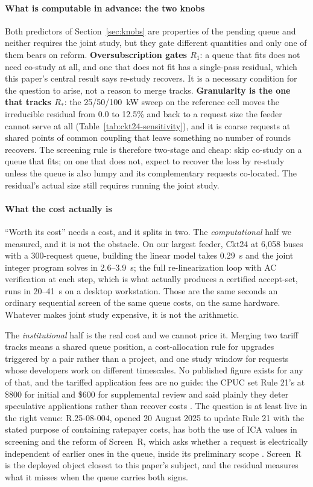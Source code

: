 \documentclass[review,authoryear,12pt]{elsarticle}
\begin{document}
\paragraph{What is computable in advance: the two knobs}
Both predictors of Section~\ref{sec:knobs} are properties of the pending queue
and neither requires the joint study, but they gate different quantities and
only one of them bears on reform. \textbf{Oversubscription gates $R_{1}$}: a
queue that fits does not need co-study at all, and one that does not fit has a
single-pass residual, which this paper's central result says re-study
recovers. It is a necessary condition for the question to arise, not a reason
to merge tracks. \textbf{Granularity is the one that tracks $R_{\ast}$}: the
25/50/100~kW sweep on the reference cell moves the irreducible residual from
0.0 to 12.5\% and back to a request size the feeder cannot serve at all
(Table~\ref{tab:ckt24-sensitivity}), and it is coarse requests at shared
points of common coupling that leave something no number of rounds recovers.
The screening rule is therefore two-stage and cheap: skip co-study on a queue
that fits; on one that does not, expect to recover the loss by re-study unless
the queue is also lumpy and its complementary requests co-located. The
residual's actual size still requires running the joint study.

\paragraph{What the cost actually is}
``Worth its cost'' needs a cost, and it splits in two. The
\emph{computational} half we measured, and it is not the obstacle. On our
largest feeder, Ckt24 at 6{,}058 buses with a 300-request queue, building the
linear model takes 0.29~s and the joint integer program solves in 2.6--3.9~s;
the full re-linearization loop with AC verification at each step, which is what
actually produces a certified accept-set, runs in 20--41~s on a desktop
workstation. Those are the same seconds an ordinary sequential screen of the
same queue costs, on the same hardware. Whatever makes joint study expensive,
it is not the arithmetic.

The \emph{institutional} half is the real cost and we cannot price it. Merging
two tariff tracks means a shared queue position, a cost-allocation rule for
upgrades triggered by a pair rather than a project, and one study window for
requests whose developers work on different timescales. No published figure
exists for any of that, and the tariffed application fees are no guide: the
CPUC set Rule 21's at \$800 for initial and \$600 for supplemental review and
said plainly they deter speculative applications rather than recover costs
\citep{cpuc_d0508013}. The question is at least live in the right venue:
R.25-08-004, opened 20 August 2025 to update Rule 21 with the stated purpose of
containing ratepayer costs, has both the use of ICA values in screening and the
reform of Screen~R, which asks whether a request is electrically independent
of earlier ones in the queue, inside its preliminary scope
\citep{cpuc_oir2025}. Screen~R is the deployed object closest to this paper's
subject, and the residual measures what it misses when the queue carries both
signs.
\end{document}
